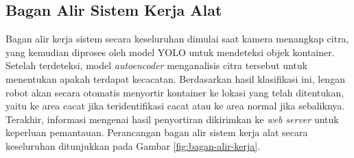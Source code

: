 \subsection{Bagan Alir Sistem Kerja Alat}
Bagan alir kerja sistem secara keseluruhan dimulai saat kamera
menangkap citra, yang
kemudian diproses oleh model YOLO untuk mendeteksi objek kontainer.
Setelah terdeteksi, model \textit{autoencoder} menganalisis citra tersebut
untuk menentukan apakah terdapat kecacatan. Berdasarkan hasil
klasifikasi ini, lengan robot akan secara otomatis menyortir
kontainer ke lokasi yang telah ditentukan, yaitu ke area cacat jika
teridentifikasi cacat atau ke area normal jika sebaliknya.
Terakhir, informasi mengenai hasil penyortiran dikirimkan ke \textit{web
server} untuk keperluan pemantauan. Perancangan bagan alir sistem kerja
alat secara keseluruhan ditunjukkan pada Gambar \ref{fig:bagan-alir-kerja}.


